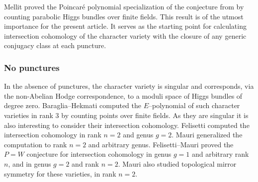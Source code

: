 Mellit \cite{Mellit2020} proved the Poincaré polynomial specialization of the conjecture from \cite{Hausel_Letellier_Villegas} by counting parabolic Higgs bundles over finite fields. This result is of the utmost importance for the present article. It serves as the starting point for calculating intersection cohomology of the character variety with the closure of any generic conjugacy class at each puncture.

\subsubsection{No punctures}
In the absence of punctures, the character variety is singular and corresponds, via the non-Abelian Hodge correspondence, to a moduli space of Higgs bundles of degree zero. Baraglia--Hekmati \cite{Baraglia_Hekmati} computed the $E$--polynomial of such character varieties in rank $3$ by counting points over finite fields. As they are singular it is also interesting to consider their intersection cohomology. Felisetti \cite{Felisetti_2021} computed the intersection cohomology in rank $n=2$ and genus $g=2$. Mauri \cite{Mauri} generalized the computation to rank $n=2$ and arbitrary genus. Felisetti--Mauri \cite{felisetti_mauri} proved the $P=W$ conjecture for intersection cohomology in genus $g=1$ and arbitrary rank $n$, and in genus $g=2$ and rank $n=2$. Mauri \cite{Mauri2021} also studied topological mirror symmetry for these varieties, in rank $n=2$.

